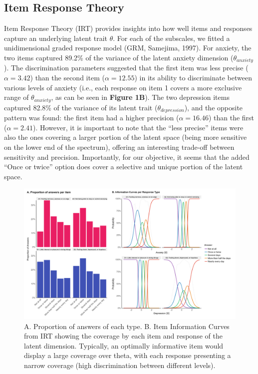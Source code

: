 \documentclass[
  man,floatsintext]{apa6}
\begin{document}
\hypertarget{item-response-theory}{%
\subsection{Item Response Theory}\label{item-response-theory}}

Item Response Theory (IRT) provides insights into how well items and responses capture an underlying latent trait \(\theta\). For each of the subscales, we fitted a unidimensional graded response model (GRM, Samejima, 1997). For anxiety, the two items captured 89.2\% of the variance of the latent anxiety dimension (\(\theta_{anxiety}\)). The discrimination parameters suggested that the first item was less precise (\(\alpha = 3.42\)) than the second item (\(\alpha = 12.55\)) in its ability to discriminate between various levels of anxiety (i.e., each response on item 1 covers a more exclusive range of \(\theta_{anxiety}\), as can be seen in \textbf{Figure 1B}). The two depression items captured 82.8\% of the variance of its latent trait (\(\theta_{depression}\)), and the opposite pattern was found: the first item had a higher precision (\(\alpha = 16.46\)) than the first (\(\alpha = 2.41\)). However, it is important to note that the ``less precise'' items were also the ones covering a larger portion of the latent space (being more sensitive on the lower end of the spectrum), offering an interesting trade-off between sensitivity and precision. Importantly, for our objective, it seems that the added ``Once or twice'' option does cover a selective and unique portion of the latent space.

\begin{figure}
\includegraphics[width=1\linewidth]{../figures/figure1} \caption{A. Proportion of answers of each type. B. Item Information Curves from IRT showing the coverage by each item and response of the latent dimension. Typically, an optimally informative item would display a large coverage over theta, with each response presenting a narrow coverage (high discrimination between different levels).}\label{fig:unnamed-chunk-2}
\end{figure}
\end{document}
